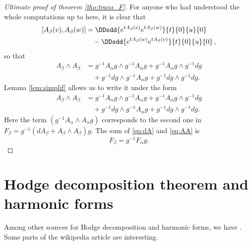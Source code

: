 \begin{proof}[Ultimate proof of theorem \ref{tho:trans_F}]
For anyone who had understood the whole computations up to here, it is clear that
\begin{equation}
\begin{split}
     [A_{\beta}(v),A_{\beta}(w)]&=\DDsdd{ e^{tA_{\beta}(v)}e^{tA_{\beta}(w)} }{t}{0}{u}{0}\\
                            &\quad-\DDsdd{ e^{tA_{\beta}(w)}e^{tA_{\beta}(v)} }{t}{0}{u}{0}\,,
\end{split}
\end{equation}
so that
\begin{equation}
\begin{split}
  A_{\beta}\wedge A_{\beta}&=g^{-1} A_{\alpha} g\wedge g^{-1} A_{\alpha} g
                         +g^{-1} A_{\alpha} g\wedge g^{-1} dg\\
		       &\quad+g^{-1} dg\wedge g^{-1} A_{\alpha} g
		       +g^{-1} dg\wedge g^{-1} dg.
\end{split}
\end{equation}
Lemma \ref{lem:simplif} allows us to write it under the form
\begin{equation}\label{eq:AA}
\begin{split}
  A_{\beta}\wedge A_{\beta}&=g^{-1} A_{\alpha} g\wedge g^{-1} A_{\alpha} g
                         +g^{-1} A_{\alpha} g\wedge g^{-1} dg\\
		       &\quad+g^{-1} dg\wedge g^{-1} A_{\alpha} g
		       +g^{-1} dg\wedge g^{-1} dg.
\end{split}
\end{equation}
Here the term $(g^{-1} A_{\alpha}\wedge A_{\alpha} g)$ corresponds to the second one in $F_{\beta}=g^{-1}(dA_{\beta}+A_{\beta}\wedge A_{\beta})g$. The sum of \eqref{eq:dA} and \eqref{eq:AA} is
\[
    F_{\beta}=g^{-1} F_{\alpha} g.
\]
\end{proof}

\section{Hodge decomposition theorem and harmonic forms}

Among other sources for Hodge decomposition and harmonic forms, we have \cite{CohoHarBound,UndergradDeRham}. Some parts of the wikipedia article  are interesting.

